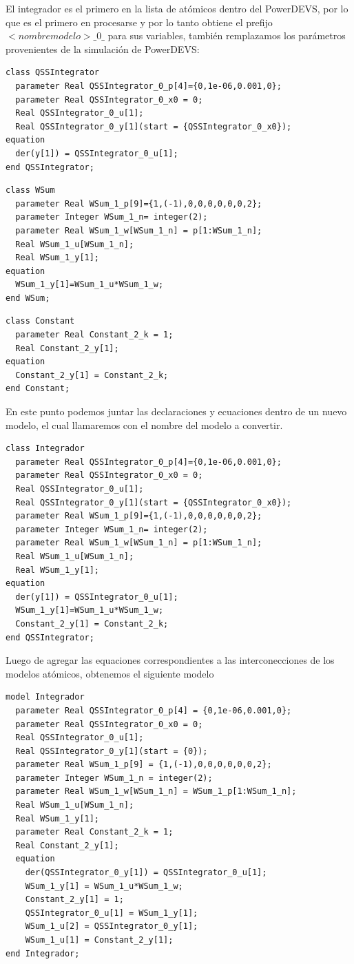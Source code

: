 \documentclass[a4paper,	11pt]{report}
\begin{document}
El integrador es el primero en la lista de atómicos dentro del PowerDEVS, por lo que es el primero en procesarse y por lo tanto obtiene el prefijo $<nombre modelo>\_0\_$ para sus variables, también remplazamos los parámetros provenientes de la simulación de PowerDEVS:

\begin{verbatim}	
class QSSIntegrator
  parameter Real QSSIntegrator_0_p[4]={0,1e-06,0.001,0};
  parameter Real QSSIntegrator_0_x0 = 0;
  Real QSSIntegrator_0_u[1];
  Real QSSIntegrator_0_y[1](start = {QSSIntegrator_0_x0});
equation
  der(y[1]) = QSSIntegrator_0_u[1];
end QSSIntegrator;
\end{verbatim}

\begin{verbatim}
class WSum
  parameter Real WSum_1_p[9]={1,(-1),0,0,0,0,0,0,2};
  parameter Integer WSum_1_n= integer(2);
  parameter Real WSum_1_w[WSum_1_n] = p[1:WSum_1_n];
  Real WSum_1_u[WSum_1_n];
  Real WSum_1_y[1];
equation
  WSum_1_y[1]=WSum_1_u*WSum_1_w;
end WSum;
\end{verbatim}

\begin{verbatim}	
class Constant
  parameter Real Constant_2_k = 1;
  Real Constant_2_y[1];
equation
  Constant_2_y[1] = Constant_2_k;
end Constant;	
\end{verbatim}

En este punto podemos juntar las declaraciones y ecuaciones dentro de un nuevo modelo, el cual llamaremos con el nombre del modelo a convertir.

\begin{verbatim}	
class Integrador
  parameter Real QSSIntegrator_0_p[4]={0,1e-06,0.001,0};
  parameter Real QSSIntegrator_0_x0 = 0;
  Real QSSIntegrator_0_u[1];
  Real QSSIntegrator_0_y[1](start = {QSSIntegrator_0_x0});
  parameter Real WSum_1_p[9]={1,(-1),0,0,0,0,0,0,2};
  parameter Integer WSum_1_n= integer(2);
  parameter Real WSum_1_w[WSum_1_n] = p[1:WSum_1_n];
  Real WSum_1_u[WSum_1_n];
  Real WSum_1_y[1];
equation
  der(y[1]) = QSSIntegrator_0_u[1];
  WSum_1_y[1]=WSum_1_u*WSum_1_w;
  Constant_2_y[1] = Constant_2_k;
end QSSIntegrator;
\end{verbatim}

Luego de agregar las equaciones correspondientes a las interconecciones de los modelos atómicos, obtenemos el siguiente modelo
	
\begin{verbatim}
model Integrador
  parameter Real QSSIntegrator_0_p[4] = {0,1e-06,0.001,0};
  parameter Real QSSIntegrator_0_x0 = 0;
  Real QSSIntegrator_0_u[1];
  Real QSSIntegrator_0_y[1](start = {0});
  parameter Real WSum_1_p[9] = {1,(-1),0,0,0,0,0,0,2};
  parameter Integer WSum_1_n = integer(2);
  parameter Real WSum_1_w[WSum_1_n] = WSum_1_p[1:WSum_1_n];
  Real WSum_1_u[WSum_1_n];
  Real WSum_1_y[1];
  parameter Real Constant_2_k = 1;
  Real Constant_2_y[1];
  equation
    der(QSSIntegrator_0_y[1]) = QSSIntegrator_0_u[1];
    WSum_1_y[1] = WSum_1_u*WSum_1_w;
    Constant_2_y[1] = 1;
    QSSIntegrator_0_u[1] = WSum_1_y[1];
    WSum_1_u[2] = QSSIntegrator_0_y[1];
    WSum_1_u[1] = Constant_2_y[1];
end Integrador;
\end{verbatim}
\end{document}
